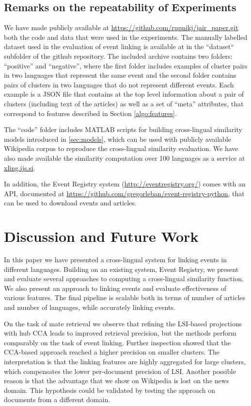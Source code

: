 \documentclass[twoside,11pt]{article}
\begin{document}
\subsection{Remarks on the repeatability of Experiments}
We have made publicly available at \url{https://github.com/rupnikj/jair_paper.git} both the code and data that were used in the experiments.
The manually labelled dataset used in the evaluation of event linking is available at in the ``dataset`` subfolder of the github repository. The included archive contains two folders: ``positive'' and ``negative'', where the first folder includes examples of cluster pairs in two languages that represent the same event and the second folder contains pairs of clusters in two languages that do not represent different events. Each example is a JSON file that contains at the top level information about a pair of clusters (including text of the articles) as well as a set of ``meta'' attributes, that correspond to features described in Section \ref{algo:features}.

The ``code'' folder includes MATLAB scripts for building cross-lingual similarity models introduced in \ref{sec:models}, which can be used with publicly available Wikipedia corpus to reproduce the cross-lingual similarity evaluation. We have also made available the similarity computation over 100 languages as a service at \url{xling.ijs.si}.

In addition, the Event Registry system (\url{http://eventregistry.org/}) comes with an API, documented at \url{https://github.com/gregorleban/event-registry-python}, that can be used to download events and articles.

\section{Discussion and Future Work}

In this paper we have presented a cross-lingual system for linking events in different languages. Building on an existing system, Event Registry, we present and evaluate several approaches to computing a  cross-lingual similarity function. We also present an approach to linking events and evaluate effectiveness of various features.  The  final pipeline is scalable both in terms of number of articles and number of languages, while accurately linking events.

On the task of mate retrieval we observe that refining the LSI-based projections with hub CCA leads to improved retrieval precision, but the methods perform comparably on the task of event linking. Further inspection showed that the CCA-based approach reached a higher precision on smaller clusters. The interpretation is that the linking features are highly aggregated for large clusters, which compensates the lower per-document precision of LSI. Another possible reason is that the advantage that we show on Wikipedia is lost on the news domain. This hypothesis could be validated by testing the approach on documents from a different domain.
\end{document}
